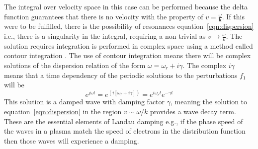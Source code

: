 The integral over velocity space in this case can be performed because the delta function guarantees that there is no velocity with the property of $v = \frac{\omega}{\mathbf{k}}$. If this were to be fulfilled, there is the possibility of resonances equation~\ref{eqn:dispersion} i.e., there is a singularity in the integral, requiring a non-trivial as $v \rightarrow \frac{\omega}{k}$. The solution requires integration is performed in complex space using a method called contour integration \citep{melrose1989}. The use of contour integration means there will be complex solutions of the dispersion relation of the form $\omega = \omega_r + i\gamma$.
The complex $i\gamma$ means that a time dependency of the periodic solutions to the perturbations $f_1$ will be 
\begin{equation}
e^{j\omega t}=e^{(i[\omega_r + i\gamma])}=e^{i\omega_rt}e^{-\gamma t}
\label{eqn:growth}
\end{equation}
This solution is a damped wave with damping factor $\gamma$, meaning the solution to equation~\ref{eqn:dispersion} in the region $v \sim \omega/k$ provides a wave decay term. These are the essential elements of Landau damping e.g., if the phase speed of the waves in a plasma match the speed of electrons in the distribution function then those waves will experience a damping.

